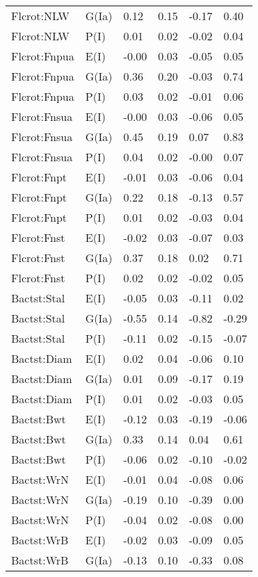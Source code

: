 \begin{center}
\begin{longtable}{|p{1.1in}|p{0.7in}|p{0.7in}|p{0.6in}|p{0.6in}|p{0.6in}|}
  Flcrot:NLW & G(Ia) & 0.12 & 0.15 & -0.17 & 0.40 \\ 
  Flcrot:NLW & P(I) & 0.01 & 0.02 & -0.02 & 0.04 \\ 
  Flcrot:Fnpua & E(I) & -0.00 & 0.03 & -0.05 & 0.05 \\ 
  Flcrot:Fnpua & G(Ia) & 0.36 & 0.20 & -0.03 & 0.74 \\ 
  Flcrot:Fnpua & P(I) & 0.03 & 0.02 & -0.01 & 0.06 \\ 
  Flcrot:Fnsua & E(I) & -0.00 & 0.03 & -0.06 & 0.05 \\ 
  Flcrot:Fnsua & G(Ia) & 0.45 & 0.19 & 0.07 & 0.83 \\ 
  Flcrot:Fnsua & P(I) & 0.04 & 0.02 & -0.00 & 0.07 \\ 
  Flcrot:Fnpt & E(I) & -0.01 & 0.03 & -0.06 & 0.04 \\ 
  Flcrot:Fnpt & G(Ia) & 0.22 & 0.18 & -0.13 & 0.57 \\ 
  Flcrot:Fnpt & P(I) & 0.01 & 0.02 & -0.03 & 0.04 \\ 
  Flcrot:Fnst & E(I) & -0.02 & 0.03 & -0.07 & 0.03 \\ 
  Flcrot:Fnst & G(Ia) & 0.37 & 0.18 & 0.02 & 0.71 \\ 
  Flcrot:Fnst & P(I) & 0.02 & 0.02 & -0.02 & 0.05 \\ 
  Bactst:Stal & E(I) & -0.05 & 0.03 & -0.11 & 0.02 \\ 
  Bactst:Stal & G(Ia) & -0.55 & 0.14 & -0.82 & -0.29 \\ 
  Bactst:Stal & P(I) & -0.11 & 0.02 & -0.15 & -0.07 \\ 
  Bactst:Diam & E(I) & 0.02 & 0.04 & -0.06 & 0.10 \\ 
  Bactst:Diam & G(Ia) & 0.01 & 0.09 & -0.17 & 0.19 \\ 
  Bactst:Diam & P(I) & 0.01 & 0.02 & -0.03 & 0.05 \\ 
  Bactst:Bwt & E(I) & -0.12 & 0.03 & -0.19 & -0.06 \\ 
  Bactst:Bwt & G(Ia) & 0.33 & 0.14 & 0.04 & 0.61 \\ 
  Bactst:Bwt & P(I) & -0.06 & 0.02 & -0.10 & -0.02 \\ 
  Bactst:WrN & E(I) & -0.01 & 0.04 & -0.08 & 0.06 \\ 
  Bactst:WrN & G(Ia) & -0.19 & 0.10 & -0.39 & 0.00 \\ 
  Bactst:WrN & P(I) & -0.04 & 0.02 & -0.08 & 0.00 \\ 
  Bactst:WrB & E(I) & -0.02 & 0.03 & -0.09 & 0.05 \\ 
  Bactst:WrB & G(Ia) & -0.13 & 0.10 & -0.33 & 0.08 \\ 

\end{longtable}
\end{center}
